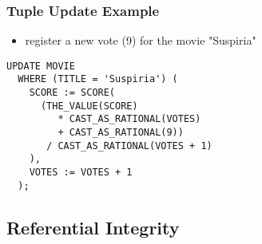 \documentclass[dvipsnames]{beamer}
\theoremstyle{plain}
\begin{document}
\begin{frame}[fragile]
  \frametitle{Tuple Update Example}

  \begin{example}
    \begin{itemize}
      \item register a new vote (9) for the movie "Suspiria"
    \end{itemize}

    \begin{lstlisting}
UPDATE MOVIE
  WHERE (TITLE = 'Suspiria') (
    SCORE := SCORE(
      (THE_VALUE(SCORE)
         * CAST_AS_RATIONAL(VOTES)
         + CAST_AS_RATIONAL(9))
       / CAST_AS_RATIONAL(VOTES + 1)
    ),
    VOTES := VOTES + 1
  );
    \end{lstlisting}
  \end{example}
\end{frame}

\subsection{Referential Integrity}
\end{document}
